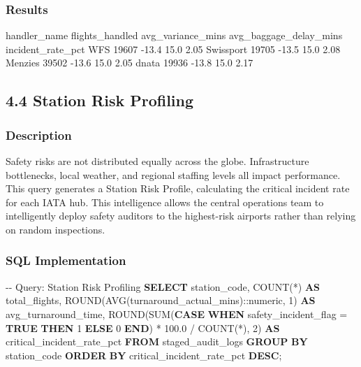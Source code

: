 \documentclass[
  letterpaper,
  DIV=11,
  numbers=noendperiod]{scrartcl}
\newenvironment{Shaded}{\begin{snugshade}}{\end{snugshade}}
\newcommand{\CharTok}[1]{\textcolor[rgb]{0.13,0.47,0.30}{#1}}
\newcommand{\CommentTok}[1]{\textcolor[rgb]{0.37,0.37,0.37}{#1}}
\newcommand{\ControlFlowTok}[1]{\textcolor[rgb]{0.00,0.23,0.31}{\textbf{#1}}}
\newcommand{\DecValTok}[1]{\textcolor[rgb]{0.68,0.00,0.00}{#1}}
\newcommand{\FloatTok}[1]{\textcolor[rgb]{0.68,0.00,0.00}{#1}}
\newcommand{\FunctionTok}[1]{\textcolor[rgb]{0.28,0.35,0.67}{#1}}
\newcommand{\KeywordTok}[1]{\textcolor[rgb]{0.00,0.23,0.31}{\textbf{#1}}}
\newcommand{\NormalTok}[1]{\textcolor[rgb]{0.00,0.23,0.31}{#1}}
\newcommand{\OperatorTok}[1]{\textcolor[rgb]{0.37,0.37,0.37}{#1}}
\begin{document}
\subsubsection{Results}

handler\_name flights\_handled avg\_variance\_mins
avg\_baggage\_delay\_mins incident\_rate\_pct WFS 19607 -13.4 15.0 2.05
Swissport 19705 -13.5 15.0 2.08 Menzies 39502 -13.6 15.0 2.05 dnata
19936 -13.8 15.0 2.17

\subsection{4.4 Station Risk Profiling}\label{station-risk-profiling}

\subsubsection{Description}

Safety risks are not distributed equally across the globe.
Infrastructure bottlenecks, local weather, and regional staffing levels
all impact performance. This query generates a Station Risk Profile,
calculating the critical incident rate for each IATA hub. This
intelligence allows the central operations team to intelligently deploy
safety auditors to the highest-risk airports rather than relying on
random inspections.

\subsubsection{SQL Implementation}

\begin{Shaded}
\begin{Highlighting}[]
\CommentTok{{-}{-} Query: Station Risk Profiling}
\KeywordTok{SELECT} 
\NormalTok{    station\_code,}
    \FunctionTok{COUNT}\NormalTok{(}\OperatorTok{*}\NormalTok{) }\KeywordTok{AS}\NormalTok{ total\_flights,}
    \FunctionTok{ROUND}\NormalTok{(}\FunctionTok{AVG}\NormalTok{(turnaround\_actual\_mins):}\CharTok{:numeric}\NormalTok{, }\DecValTok{1}\NormalTok{) }\KeywordTok{AS}\NormalTok{ avg\_turnaround\_time,}
    \FunctionTok{ROUND}\NormalTok{(}\FunctionTok{SUM}\NormalTok{(}\ControlFlowTok{CASE} \ControlFlowTok{WHEN}\NormalTok{ safety\_incident\_flag }\OperatorTok{=} \KeywordTok{TRUE} \ControlFlowTok{THEN} \DecValTok{1} \ControlFlowTok{ELSE} \DecValTok{0} \ControlFlowTok{END}\NormalTok{) }\OperatorTok{*} \FloatTok{100.0} \OperatorTok{/} \FunctionTok{COUNT}\NormalTok{(}\OperatorTok{*}\NormalTok{), }\DecValTok{2}\NormalTok{) }\KeywordTok{AS}\NormalTok{ critical\_incident\_rate\_pct}
\KeywordTok{FROM}\NormalTok{ staged\_audit\_logs}
\KeywordTok{GROUP} \KeywordTok{BY}\NormalTok{ station\_code}
\KeywordTok{ORDER} \KeywordTok{BY}\NormalTok{ critical\_incident\_rate\_pct }\KeywordTok{DESC}\NormalTok{;}
\end{Highlighting}
\end{Shaded}
\end{document}
